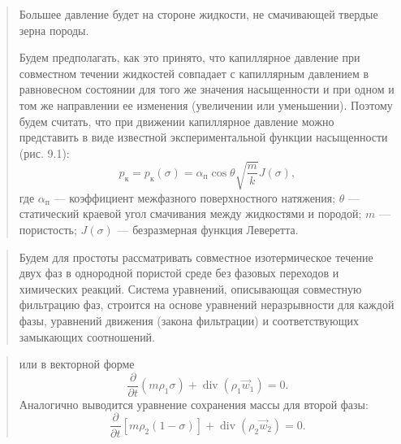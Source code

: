 \documentclass[12pt,a4paper]{article}
\DeclareMathOperator{\Div}{div}
\begin{document}
\begin{quote}
Большее давление будет на стороне жидкости, не смачивающей твердые зерна породы.

Будем предполагать, как это принято, что капиллярное давление при совместном течении жидкостей совпадает с капиллярным давлением в равновесном состоянии для того же значения насыщенности и при одном и том же направлении ее изменения (увеличении или уменьшении). Поэтому будем считать, что при движении капиллярное давление можно представить в виде известной экспериментальной функции насыщенности (рис. 9.1):
\begin{equation}p_\text{к}=p_\text{к}(\sigma)=\alpha_\text{п}\cos\theta\sqrt{\frac{m}{k}}J(\sigma),\tag{9.6}\label{q10:eq-9-6}\end{equation}
где $\alpha_\text{п}$ --- коэффициент межфазного поверхностного натяжения; $\theta$ --- статический краевой угол смачивания между жидкостями и породой; $m$ --- пористость; $J(\sigma)$ --- безразмерная функция Леверетта.


\par\nobreak{}\par
\end{quote}

\begin{quote}\sloppy
Будем для простоты рассматривать совместное изотермическое течение двух фаз в однородной пористой среде без фазовых переходов и химических реакций. Система уравнений, описывающая совместную фильтрацию фаз, строится на основе уравнений неразрывности для каждой фазы, уравнений движения (закона фильтрации) и соответствующих замыкающих соотношений.
\par\nobreak{}\par
\end{quote}

\begin{quote}\sloppy
или в векторной форме
\begin{equation}\frac{\partial}{\partial t}(m\rho_1\sigma)+\Div(\rho_1\vec w_1)=0.\tag{9.9}\label{q10:eq-9-9}\end{equation}
Аналогично выводится уравнение сохранения массы для второй фазы:
\begin{equation}\frac{\partial}{\partial t}[m\rho_2(1-\sigma)]+\Div(\rho_2\vec w_2)=0.\tag{9.10}\label{q10:eq-9-10}\end{equation}
\par\nobreak{}\par
\end{quote}
\end{document}
